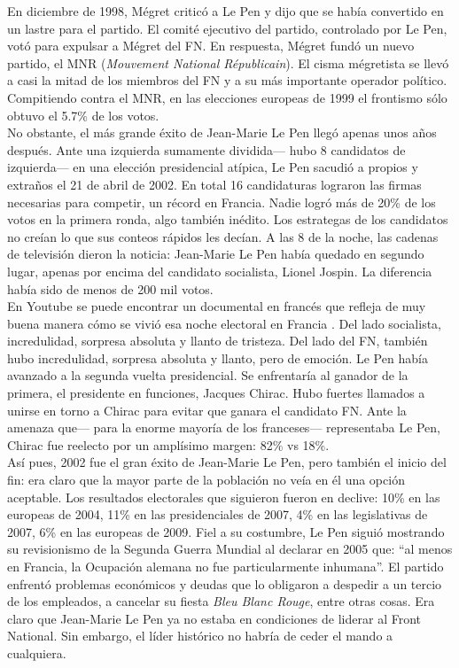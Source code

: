 En diciembre de 1998, Mégret criticó a Le Pen y dijo que se había convertido en un lastre para el partido. El comité ejecutivo del partido, controlado por Le Pen, votó para expulsar a Mégret del FN. En respuesta, Mégret fundó un nuevo partido, el MNR (\textit{Mouvement National Républicain}). El cisma mégretista se llevó a casi la mitad de los miembros del FN y a su más importante operador político. Compitiendo contra el MNR, en las elecciones europeas de 1999 el frontismo sólo obtuvo el 5.7\% de los votos.\\ 

No obstante, el más grande éxito de Jean-Marie Le Pen llegó apenas unos años después. Ante una izquierda sumamente dividida--- hubo 8 candidatos de izquierda--- en una elección presidencial atípica, Le Pen sacudió a propios y extraños el 21 de abril de 2002. En total 16 candidaturas lograron las firmas necesarias para competir, un récord en Francia. Nadie logró más de 20\% de los votos en la primera ronda, algo también inédito. Los estrategas de los candidatos no creían lo que sus conteos rápidos les decían. A las 8 de la noche, las cadenas de televisión dieron la noticia: Jean-Marie Le Pen había quedado en segundo lugar, apenas por encima del candidato socialista, Lionel Jospin. La diferencia había sido de menos de 200 mil votos.\\ 

En Youtube se puede encontrar un documental en francés que refleja de muy buena manera cómo se vivió esa noche electoral en Francia \parencite{Capo17}. Del lado socialista, incredulidad, sorpresa absoluta y llanto de tristeza. Del lado del FN, también hubo incredulidad, sorpresa absoluta y llanto, pero de emoción. Le Pen había avanzado a la segunda vuelta presidencial. Se enfrentaría al ganador de la primera, el presidente en funciones, Jacques Chirac. Hubo fuertes llamados a unirse en torno a Chirac para evitar que ganara el candidato FN. Ante la amenaza que--- para la enorme mayoría de los franceses--- representaba Le Pen, Chirac fue reelecto por un amplísimo margen: 82\% vs 18\%.\\

Así pues, 2002 fue el gran éxito de Jean-Marie Le Pen, pero también el inicio del fin: era claro que la mayor parte de la población no veía en él una opción aceptable. Los resultados electorales que siguieron fueron en declive: 10\% en las europeas de 2004, 11\% en las presidenciales de 2007, 4\% en las legislativas de 2007, 6\% en las europeas de 2009. Fiel a su costumbre, Le Pen siguió mostrando su revisionismo de la Segunda Guerra Mundial al declarar en 2005 que: ``al menos en Francia, la Ocupación alemana no fue particularmente inhumana''. El partido enfrentó problemas económicos y deudas que lo obligaron a despedir a un tercio de los empleados, a cancelar su fiesta \textit{Bleu Blanc Rouge}, entre otras cosas. Era claro que Jean-Marie Le Pen ya no estaba en condiciones de liderar al Front National. Sin embargo, el líder histórico no habría de ceder el mando a cualquiera.

